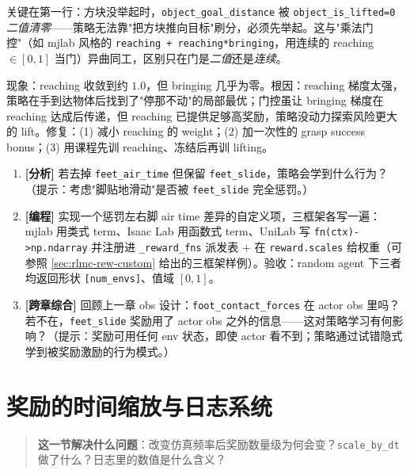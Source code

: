 关键在第一行：方块没举起时，\verb|object_goal_distance| 被 \verb|object_is_lifted=0| \emph{二值清零}——策略无法靠"把方块推向目标"刷分，必须先举起。这与"乘法门控"（如 mjlab 风格的 \verb|reaching + reaching*bringing|，用连续的 reaching $\in[0,1]$ 当门）异曲同工，区别只在门是\emph{二值}还是\emph{连续}。

\begin{pitfall}
现象：reaching 收敛到约 $1.0$，但 bringing 几乎为零。根因：reaching 梯度太强，策略在手到达物体后找到了"停那不动"的局部最优；门控虽让 bringing 梯度在 reaching 达成后传递，但 reaching 已提供足够高奖励，策略没动力探索风险更大的 lift。修复：(1) 减小 reaching 的 weight；(2) 加一次性的 grasp success bonus；(3) 用课程先训 reaching、冻结后再训 lifting。
\end{pitfall}

\begin{practice}[练习·辅助三层]
\begin{enumerate}
  \item \textbf{[分析]} 若去掉 \verb|feet_air_time| 但保留 \verb|feet_slide|，策略会学到什么行为？（提示：考虑"脚贴地滑动"是否被 \verb|feet_slide| 完全惩罚。）
  \item \textbf{[编程]} 实现一个惩罚左右脚 air time 差异的自定义项，三框架各写一遍：mjlab 用类式 term、Isaac Lab 用函数式 term、UniLab 写 \verb|fn(ctx)->np.ndarray| 并注册进 \verb|_reward_fns| 派发表 $+$ 在 \verb|reward.scales| 给权重（可参照 \cref{sec:rlmc-rew-custom} 给出的三框架样例）。验收：random agent 下三者均返回形状 \verb|[num_envs]|、值域 $[0,1]$。
  \item \textbf{[跨章综合]} 回顾上一章 obs 设计：\verb|foot_contact_forces| 在 actor obs 里吗？若不在，\verb|feet_slide| 奖励用了 actor obs 之外的信息——这对策略学习有何影响？（提示：奖励可用任何 env 状态，即使 actor 看不到；策略通过试错隐式学到被奖励激励的行为模式。）
\end{enumerate}
\end{practice}

\section{奖励的时间缩放与日志系统}
\label{sec:rlmc-rew-dt}

\begin{quote}\small
\textbf{这一节解决什么问题}：改变仿真频率后奖励数量级为何会变？\texttt{scale\_by\_dt} 做了什么？日志里的数值是什么含义？
\end{quote}

